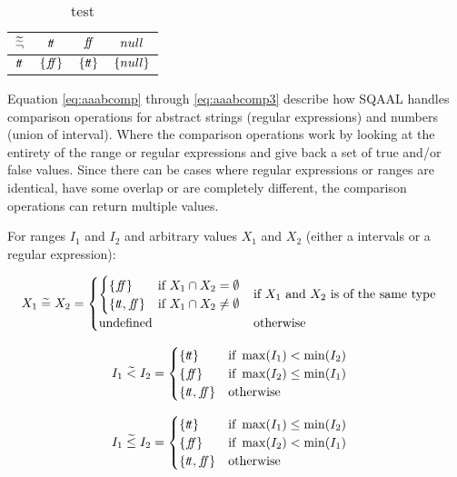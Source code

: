 \begin{table}[H]
    \centering
    \caption{test}
    \begin{tabular}{c|ccc}
        $\widetilde{\widetilde{\neg}}$ & $t\!t$ & $f\!\!f$ & $null$ \\
        \hline
        $t\!t$ & $\{f\!\!f\}$ & $\{t\!t\}$ & $\{null\}$ \\
    \end{tabular}
    \label{tab:aaabneg}
\end{table}

Equation \ref{eq:aaabcomp} through \ref{eq:aaabcomp3} describe how SQAAL handles comparison operations for abstract strings (regular expressions) and numbers (union of interval).
Where the comparison operations work by looking at the entirety of the range or regular expressions and give back a set of true and/or false values.
Since there can be cases where regular expressions or ranges are identical, have some overlap or are completely different, the comparison operations can return multiple values.


For ranges $I_1$ and $I_2$ and arbitrary values $X_1$ and $X_2$ (either a intervals or a regular expression):

\begin{align} \label{eq:aaabcomp}
    X_1 \;\aab{=}\; X_2 &= \begin{cases}
        \begin{cases}
        \{\false\} & \text{if } X_1 \cap X_2 = \emptyset \\
        \{\true, \false\} & \text{if } X_1 \cap X_2 \neq \emptyset
        \end{cases} & \text{if $X_1$ and $X_2$ is of the same type} \\
        \text{undefined} & \text{otherwise}
    \end{cases}
\end{align}

\begin{align}\label{eq:aaabcomp2}
    I_1 \;\aab{<}\; I_2 &= \begin{cases}
        \{\true\} & \text{if } \max(I_1) < \min(I_2) \\
        \{\false\} & \text{if } \max(I_2) \leq \min (I_1) \\
        \{\true, \false\} & \text{otherwise}
    \end{cases}
\end{align}

\begin{align}\label{eq:aaabcomp3}
    I_1 \;\aab{\leq}\; I_2 &= \begin{cases}
        \{\true\} & \text{if } \max(I_1) \leq \min(I_2) \\
        \{\false\} & \text{if } \max(I_2) < \min (I_1) \\
        \{\true, \false\} & \text{otherwise}
    \end{cases}
\end{align}

